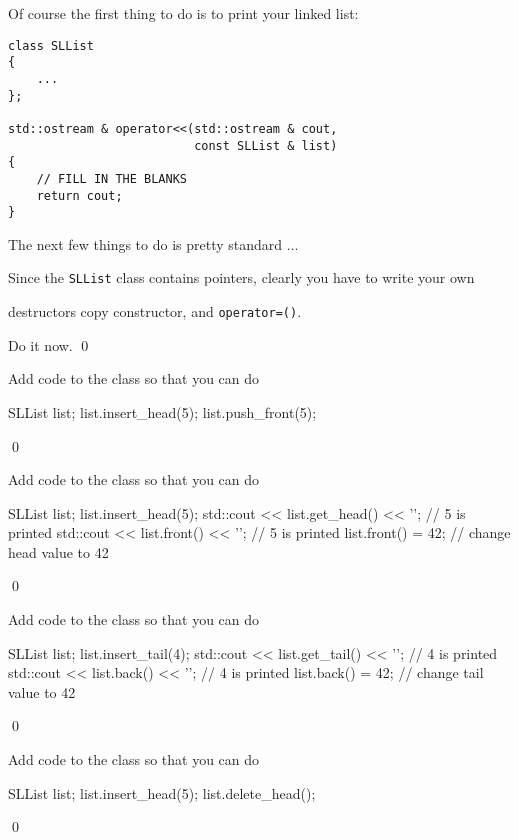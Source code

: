Of course the first thing to do is to print your linked list:
{\small
\begin{Verbatim}[frame=single]
class SLList
{
    ...
};

std::ostream & operator<<(std::ostream & cout,
                          const SLList & list)
{
    // FILL IN THE BLANKS
    return cout;
}
\end{Verbatim}

The next few things to do is pretty standard ...

\begin{ex}
Since the \texttt{SLList} class contains pointers,
clearly you have to write your own
\begin{enumerate}[nosep]
  \li destructors
  \li copy constructor, and
  \li \verb!operator=()!.
\end{enumerate}
Do it now.
\qed
\end{ex}

\begin{ex}
Add code to the class so that you can do
\begin{console}
SLList list;
list.insert_head(5);
list.push_front(5); 
\end{console}
\qed
\end{ex}

\begin{ex}
Add code to the class so that you can do
\begin{console}
SLList list;
list.insert_head(5);
std::cout << list.get_head() << '\n'; // 5 is printed
std::cout << list.front() << '\n';    // 5 is printed
list.front() = 42;    // change head value to 42
\end{console}
\qed
\end{ex}

\begin{ex}
Add code to the class so that you can do
\begin{console}
SLList list;
list.insert_tail(4);
std::cout << list.get_tail() << '\n'; // 4 is printed
std::cout << list.back() << '\n';      // 4 is printed
list.back() = 42;   // change tail value to 42
\end{console}
\qed
\end{ex}

\begin{ex}
Add code to the class so that you can do
\begin{console}
SLList list;
list.insert_head(5);
list.delete_head();
\end{console}
\qed
\end{ex}

}
